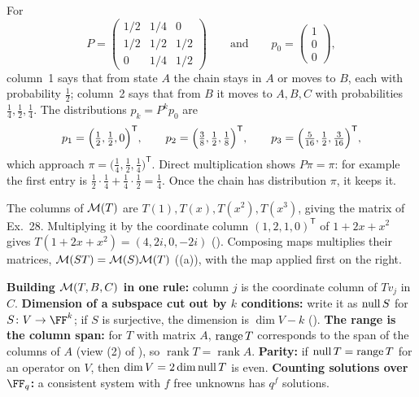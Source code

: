 \documentclass[10pt]{scrartcl}
\begin{document}
\begin{example*}
  For
  \[
    P = \begin{pmatrix} 1/2 & 1/4 & 0 \\ 1/2 & 1/2 & 1/2 \\ 0 & 1/4 & 1/2 \end{pmatrix}
    \qquad\text{and}\qquad
    p_0 = \begin{pmatrix} 1 \\ 0 \\ 0 \end{pmatrix},
  \]
  column~1 says that from state $A$ the chain stays in $A$ or moves to $B$, each with probability $\tfrac12$; column~2 says that from $B$ it moves to $A,B,C$ with probabilities $\tfrac14,\tfrac12,\tfrac14$. The distributions $p_k=P^kp_0$ are
  \[
    p_1=\Bigl(\tfrac12,\tfrac12,0\Bigr)^{\mathsf T},\qquad p_2=\Bigl(\tfrac38,\tfrac12,\tfrac18\Bigr)^{\mathsf T},\qquad p_3=\Bigl(\tfrac{5}{16},\tfrac12,\tfrac{3}{16}\Bigr)^{\mathsf T},
  \]
  which approach $\pi=\big(\frac14,\frac12,\frac14\big)^{\mathsf T}$. Direct multiplication shows $P\pi=\pi$: for example the first entry is $\tfrac12\cdot\tfrac14+\tfrac14\cdot\tfrac12=\tfrac14$. Once the chain has distribution $\pi$, it keeps it.
\end{example*}

\revisit The columns of $\mathcal M(T)$ are $T(1),T(x),T(x^2),T(x^3)$, giving the matrix of Ex.~28. Multiplying it by the coordinate column $(1,2,1,0)^{\mathsf T}$ of $1+2x+x^2$ gives $T(1+2x+x^2)=(4,2i,0,-2i)$ (). Composing maps multiplies their matrices, $\mathcal M(ST)=\mathcal M(S)\mathcal M(T)$ ((a)), with the map applied first on the right.

\begin{shortcuts}
  \ii \textbf{Building $\mathcal M(T,B,C)$ in one rule:} column $j$ is the coordinate column of $Tv_j$ in $C$.
  \ii \textbf{Dimension of a subspace cut out by $k$ conditions:} write it as $\operatorname{null} S$ for $S\colon V\to\FF^k$; if $S$ is surjective, the dimension is $\dim V-k$ ().
  \ii \textbf{The range is the column span:} for $T$ with matrix $A$, $\operatorname{range} T$ corresponds to the span of the columns of $A$ (view (2) of ), so $\operatorname{rank}T=\operatorname{rank}A$.
  \ii \textbf{Parity:} if $\operatorname{null} T=\operatorname{range} T$ for an operator on $V$, then $\dim V=2\dim\operatorname{null} T$ is even.
  \ii \textbf{Counting solutions over $\FF_q$:} a consistent system with $f$ free unknowns has $q^f$ solutions.
\end{shortcuts}
\end{document}
